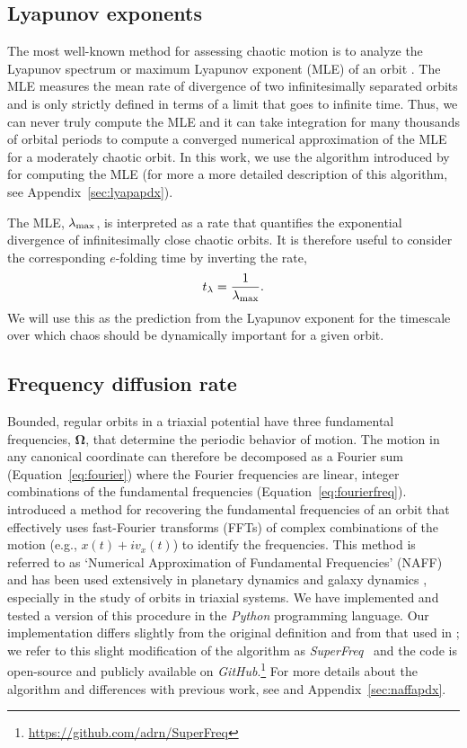 \documentclass{mn2e}
\newcommand{\bs}[1]{\boldsymbol{#1}}
\newcommand{\project}[1]{\textsl{#1}}
\newcommand{\superfreq}{\project{SuperFreq}}
\begin{document}
\subsection{Lyapunov exponents} \label{sec:lyap}

The most well-known method for assessing chaotic motion is to analyze the Lyapunov spectrum or maximum Lyapunov exponent (MLE) of an orbit \citep{lyapunov92}. The MLE measures the mean rate of divergence of two infinitesimally separated orbits and is only strictly defined in terms of a limit that goes to infinite time. Thus, we can never truly compute the MLE and it can take integration for many thousands of orbital periods to compute a converged numerical approximation of the MLE for a moderately chaotic orbit. In this work, we use the algorithm introduced by \cite{wolf85} for computing the MLE (for more a more detailed description of this algorithm, see Appendix~\ref{sec:lyapapdx}).

The MLE, $\lambda_{\rm max}$, is interpreted as a rate that quantifies the exponential divergence of infinitesimally close chaotic orbits. It is therefore useful to consider the corresponding $e$-folding time by inverting the rate,
\begin{equation}
	t_{\rm \lambda} = \frac{1}{\lambda_{\rm max}}.
\end{equation}
We will use this as the prediction from the Lyapunov exponent for the timescale over which chaos should be dynamically important for a given orbit.

\subsection{Frequency diffusion rate}\label{sec:naff}

Bounded, regular orbits in a triaxial potential have three fundamental frequencies, $\bs{\Omega}$, that determine the periodic behavior of motion. The motion in any canonical coordinate can therefore be decomposed as a Fourier sum (Equation~\ref{eq:fourier}) where the Fourier frequencies are linear, integer combinations of the fundamental frequencies (Equation~\ref{eq:fourierfreq}). \cite{laskar93} introduced a method for recovering the fundamental frequencies of an orbit that effectively uses fast-Fourier transforms (FFTs) of complex combinations of the motion (e.g., $x(t) + i v_x(t)$) to identify the frequencies. This method is referred to as `Numerical Approximation of Fundamental Frequencies' (NAFF) and has been used extensively in planetary dynamics \citep[e.g.,][]{laskar93b, laskar96} and galaxy dynamics \citep{papaphilippou98, valluri98}, especially in the study of orbits in triaxial systems. We have implemented and tested a version of this procedure in the \project{Python} programming language. Our implementation differs slightly from the original definition and from that used in \cite{valluri98}; we refer to this slight modification of the algorithm as \superfreq\ \citep{superfreq} and the code is open-source and publicly available on \project{GitHub}.\footnote{\url{https://github.com/adrn/SuperFreq}} For more details about the algorithm and differences with previous work, see \cite{laskar88, laskar93, papaphilippou96} and Appendix~\ref{sec:naffapdx}.
\end{document}
